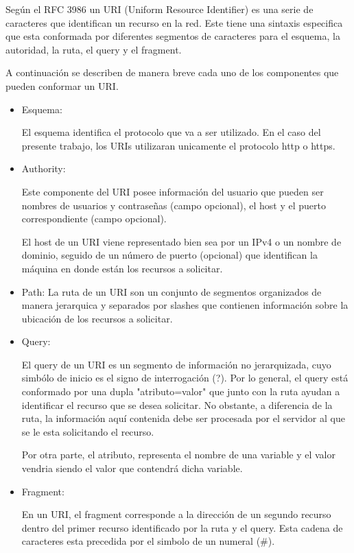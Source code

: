 Seg\'un el RFC 3986 un URI (Uniform Resource Identifier) es una serie de caracteres que identifican un recurso en la red. Este tiene una sintaxis especifica que esta conformada por diferentes segmentos de caracteres para el esquema, la autoridad, la ruta, el query y el fragment.

A continuaci\'on se describen de manera breve cada uno de los componentes que pueden conformar un URI.

\begin{itemize}

\item Esquema:

El esquema identifica el protocolo que va a ser utilizado. En el caso del presente trabajo, los URIs utilizaran unicamente el protocolo http o https.


\item Authority:

Este componente del URI posee informaci\'on del usuario que pueden ser nombres de usuarios y contraseñas (campo opcional), el host y el puerto correspondiente (campo opcional).

El host de un URI viene representado bien sea por un IPv4 o un nombre de dominio, seguido de un n\'umero de puerto (opcional) que identifican la m\'aquina en donde est\'an los recursos a solicitar.
   
\item Path:
La ruta de un URI son un conjunto de segmentos organizados de manera jerarquica y separados por slashes que contienen informaci\'on sobre la ubicaci\'on de los recursos a solicitar.

\item Query:

El query de un URI es un segmento de informaci\'on no jerarquizada, cuyo simb\'olo de inicio es el signo de interrogaci\'on (?). Por lo general, el query est\'a conformado por una dupla "atributo=valor" que junto con la ruta ayudan a identificar el recurso que se desea solicitar. No obstante, a diferencia de la ruta, la informaci\'on aqu\'i contenida debe ser procesada por el servidor al que se le esta solicitando el recurso. 

Por otra parte, el atributo, representa el nombre de una variable y el valor vendria siendo el valor que contendr\'a dicha variable.

\item Fragment:

En un URI, el fragment corresponde a la direcci\'on de un segundo recurso dentro del primer recurso identificado por la ruta y el query. Esta cadena de caracteres esta precedida por el simbolo de un numeral (\#).

\end{itemize}

